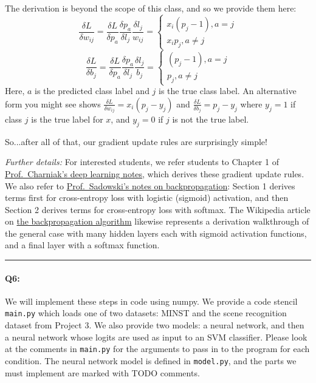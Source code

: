 The derivation is beyond the scope of this class, and so we provide them here:
\begin{equation}
    \frac{\delta L}{\delta w_{ij}} = \frac{\delta L}{\delta p_a} \frac{\delta p_a}{\delta l_j} \frac{\delta l_j}{w_{ij}} =\begin{cases}
        x_i(p_j-1), a = j \\
        x_ip_j,  a\neq j
    \end{cases}
    \label{eq:wupdate}
\end{equation}
\begin{equation}
    \frac{\delta L}{\delta b_j} = \frac{\delta L}{\delta p_a} \frac{\delta p_a}{\delta l_j} \frac{\delta l_j}{b_j} =\begin{cases}
        (p_j-1), a = j \\
        p_j,  a\neq j
    \end{cases}
    \label{eq:bupdate}
\end{equation}
Here, $a$ is the predicted class label and $j$ is the true class label. An alternative form you might see shows $\frac{\delta L}{\delta w_{ij}} = x_i(p_j-y_j)$ and $\frac{\delta L}{\delta b_j} = p_j-y_j$ where $y_j=1$ if class $j$ is the true label for $x$, and $y_j = 0$ if $j$ is not the true label.

So...after all of that, our gradient update rules are surprisingly simple!

\emph{Further details:} For interested students, we refer students to Chapter 1 of \href{https://cs.brown.edu/courses/csci1460/assets/files/deep-learning.pdf}{Prof.~Charniak's deep learning notes}, which derives these gradient update rules. We also refer to \href{https://www.ics.uci.edu/~pjsadows/notes.pdf}{Prof.~Sadowski's notes on backpropagation}: Section 1 derives terms first for cross-entropy loss with logistic (sigmoid) activation, and then Section 2 derives terms for cross-entropy loss with softmax. The Wikipedia article on \href{https://en.wikipedia.org/wiki/Backpropagation}{the backpropagation algorithm} likewise represents a derivation walkthrough of the general case with many hidden layers each with sigmoid activation functions, and a final layer with a softmax function.

\hspace{\fill}\rule{0.5\linewidth}{.5pt}\hspace{\fill}


\paragraph{Q6:} We will implement these steps in code using numpy. We provide a code stencil \texttt{main.py} which loads one of two datasets: MINST and the scene recognition dataset from Project 3. We also provide two models: a neural network, and then a neural network whose logits are used as input to an SVM classifier. Please look at the comments in \texttt{main.py} for the arguments to pass in to the program for each condition. The neural network model is defined in \texttt{model.py}, and the parts we must implement are marked with TODO comments.

